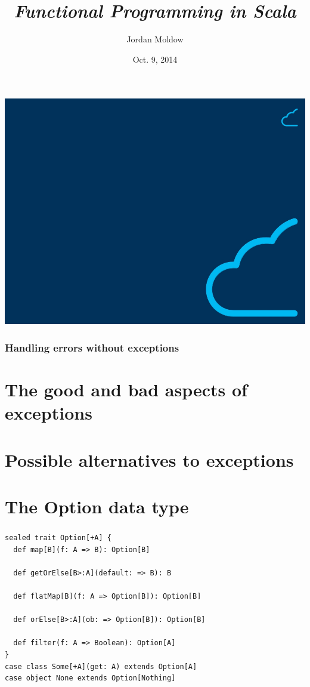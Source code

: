 \documentclass{beamer}
\title{\textit{Functional Programming in Scala}}
\subtitle{%
  Chapter 4\\%
  \subject%
}
\author{Jordan Moldow}
\date{Oct. 9, 2014}
\renewcommand{\subject}{Handling errors without exceptions}
\begin{document}
{
\usebackgroundtemplate%
{%
  \includegraphics[width=\paperwidth,height=\paperheight]{box-title.jpg}%
}
\frame{\titlepage}
}

\begin{frame}
\frametitle{\subject}
\tableofcontents
\end{frame}

\section{The good and bad aspects of exceptions}

\section{Possible alternatives to exceptions}

\section{The Option data type}

\begin{frame}[fragile]
\frametitle{\secname}
\begin{lstlisting}
sealed trait Option[+A] {
  def map[B](f: A => B): Option[B]

  def getOrElse[B>:A](default: => B): B

  def flatMap[B](f: A => Option[B]): Option[B]

  def orElse[B>:A](ob: => Option[B]): Option[B]

  def filter(f: A => Boolean): Option[A]
}
case class Some[+A](get: A) extends Option[A]
case object None extends Option[Nothing]
\end{lstlisting}
\end{frame}
\end{document}
